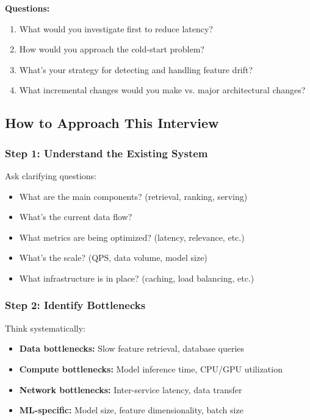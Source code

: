 \documentclass[11pt,letterpaper]{article}
\begin{document}
\textbf{Questions:}
\begin{enumerate}
    \item What would you investigate first to reduce latency?
    \item How would you approach the cold-start problem?
    \item What's your strategy for detecting and handling feature drift?
    \item What incremental changes would you make vs. major architectural changes?
\end{enumerate}

\subsection{How to Approach This Interview}

\subsubsection{Step 1: Understand the Existing System}

Ask clarifying questions:
\begin{itemize}
    \item What are the main components? (retrieval, ranking, serving)
    \item What's the current data flow?
    \item What metrics are being optimized? (latency, relevance, etc.)
    \item What's the scale? (QPS, data volume, model size)
    \item What infrastructure is in place? (caching, load balancing, etc.)
\end{itemize}

\subsubsection{Step 2: Identify Bottlenecks}

Think systematically:
\begin{itemize}
    \item \textbf{Data bottlenecks:} Slow feature retrieval, database queries
    \item \textbf{Compute bottlenecks:} Model inference time, CPU/GPU utilization
    \item \textbf{Network bottlenecks:} Inter-service latency, data transfer
    \item \textbf{ML-specific:} Model size, feature dimensionality, batch size
\end{itemize}
\end{document}
